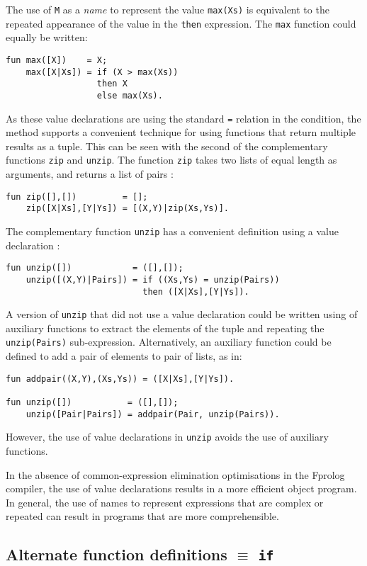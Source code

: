 \documentclass[a4paper,11pt,twoside]{article}
\begin{document}
The use of \texttt{M} as a \textit{name} to represent the value
\texttt{max(Xs)} is equivalent to the repeated appearance of
the value in the \texttt{then} expression.  The \texttt{max} function
could equally be written:
\begin{verbatim}
fun max([X])    = X;
    max([X|Xs]) = if (X > max(Xs))
                  then X
                  else max(Xs).
\end{verbatim}
As these value declarations are using the standard \texttt{=}
relation in the condition, the method supports a convenient
technique for using functions that return multiple results as a
tuple.  This can be seen with the second of the
complementary functions
\texttt{zip} and \texttt{unzip}.  The function \texttt{zip}
takes two lists of equal length as arguments, and returns a
list of pairs \cite{HAK+97}:
\begin{verbatim}
fun zip([],[])         = [];
    zip([X|Xs],[Y|Ys]) = [(X,Y)|zip(Xs,Ys)].
\end{verbatim}
The complementary function \texttt{unzip} has a convenient
definition using a value declaration \cite{Pau91}:
\begin{verbatim}
fun unzip([])            = ([],[]);
    unzip([(X,Y)|Pairs]) = if ((Xs,Ys) = unzip(Pairs))
                           then ([X|Xs],[Y|Ys]).
\end{verbatim}
A version of \texttt{unzip} that did not use a value
declaration could be written using of auxiliary functions to
extract the elements of the tuple and repeating the \texttt{unzip(Pairs)}
sub-expression.  Alternatively, an auxiliary function could be
defined to add a pair of elements to pair of lists, as in:
\begin{verbatim}
fun addpair((X,Y),(Xs,Ys)) = ([X|Xs],[Y|Ys]).

fun unzip([])           = ([],[]);
    unzip([Pair|Pairs]) = addpair(Pair, unzip(Pairs)).
\end{verbatim}
However, the use of value declarations in \texttt{unzip} avoids the
use of auxiliary functions.

In the absence of common-expression elimination optimisations in the
Fprolog compiler, the use of value declarations results in a more efficient
object program.  In general, the use of names to represent expressions
that are complex or repeated can result in programs that are more
comprehensible.

\subsection{Alternate function definitions $\equiv$ \texttt{if}}
\label{alt_if}
\end{document}
